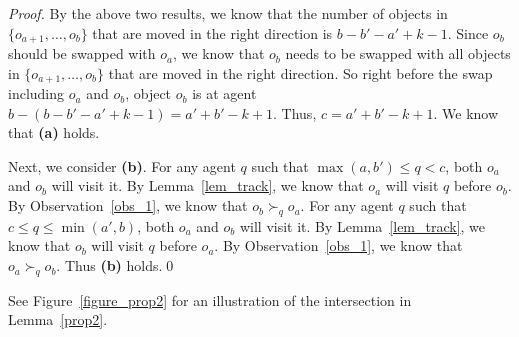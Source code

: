 \begin{proof}
    By the above two results, we know that the number of objects in $\{o_{a+1},\dots,o_b\}$ that are moved in the right direction is $b-b'-a'+k-1$.
    Since     $o_b$ should be swapped with $o_a$, we know that $o_b$ needs to be swapped with all objects in $\{o_{a+1},\dots,o_b\}$ that are moved in the right direction.
    So right before the swap including $o_a$ and $o_b$, object $o_b$ is at agent $b-(b-b'-a'+k-1)=a'+b'-k+1$. Thus, $c=a'+b'-k+1$.
    We know that \textbf{(a)} holds.

    Next, we consider \textbf{(b)}.
    For any agent $q$ such that $\max(a,b')\leq q < c$, both $o_a$ and $o_b$ will visit it. By Lemma~\ref{lem_track}, we know that $o_a$ will visit $q$ before $o_b$.
    By Observation~\ref{obs_1}, we know that $o_b \succ_q o_a$.
    For any agent $q$ such that $c \leq q \leq \min(a',b)$, both $o_a$ and $o_b$ will visit it. By Lemma~\ref{lem_track}, we know that $o_b$ will visit $q$ before $o_a$.
    By Observation~\ref{obs_1}, we know that $o_a \succ_q o_b$. Thus \textbf{(b)} holds.\qed
\end{proof}

See Figure~\ref{figure_prop2} for an illustration of the intersection in Lemma~\ref{prop2}.

